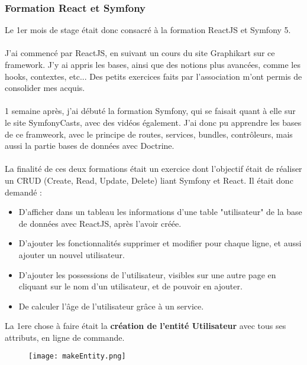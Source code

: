 \subsubsection{Formation React et Symfony}

Le 1er mois de stage était donc consacré à la formation ReactJS et Symfony 5.\\\\
J'ai commencé par ReactJS, en suivant un cours du site Graphikart sur ce framework. 
J'y ai appris les bases, ainsi que des notions plus avancées, comme les hooks, contextes, etc...
Des petits exercices faits par l'association m'ont permis de consolider mes acquis.\\\\

1 semaine après, j'ai débuté la formation Symfony, qui se faisait quant à elle sur le site SymfonyCasts, avec des vidéos également.
J'ai donc pu apprendre les bases de ce framweork, avec le principe de routes, services, bundles, contrôleurs, mais aussi la partie bases de données avec Doctrine.\\\\

La finalité de ces deux formations était un exercice dont l'objectif était de réaliser un CRUD (Create, Read, Update, Delete) liant Symfony et React.
Il était donc demandé :\\
\begin{itemize}
    \item D'afficher dans un tableau les informations d'une table "utilisateur" de la base de données avec ReactJS, après l'avoir créée.
    \item D'ajouter les fonctionnalités supprimer et modifier pour chaque ligne, et aussi ajouter un nouvel utilisateur.
    \item D'ajouter les possessions de l'utilisateur, visibles sur une autre page en cliquant sur le nom d'un utilisateur, et de pouvoir en ajouter.
    \item De calculer l'âge de l'utilisateur grâce à un service.
\end{itemize}

La 1ere chose à faire était la \textbf{création de l'entité Utilisateur} avec tous ses attributs, en ligne de commande.
\begin{figure}[H]
    \texttt{[image: makeEntity.png]}
\end{figure}


